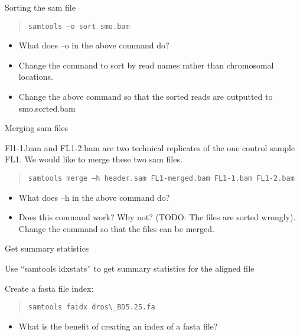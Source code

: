 \documentclass[letterpaper,10pt,english]{sphinxmanual}
\begin{document}
Sorting the sam file
\begin{quote}

\begin{Verbatim}[commandchars=\\\{\}]
samtools –o sort smo.bam
\end{Verbatim}
\end{quote}
\begin{itemize}
\item {} 
What does –o in the above command do?

\item {} 
Change the command to sort by read names rather than chromosomal locations.

\item {} 
Change the above command so that the sorted reads are outputted to smo.sorted.bam

\end{itemize}

Merging sam files

Fl1-1.bam and FL1-2.bam are two technical replicates of the one control sample FL1. We would like to merge these two sam files.
\begin{quote}

\begin{Verbatim}[commandchars=\\\{\}]
samtools merge –h header.sam FL1-merged.bam FL1-1.bam FL1-2.bam
\end{Verbatim}
\end{quote}
\begin{itemize}
\item {} 
What does –h in the above command do?

\item {} 
Does this command work? Why not? (TODO: The files are sorted wrongly). Change the command so that the files can be merged.

\end{itemize}

Get summary statistics

Use “samtools idxstats” to get summary statistics for the aligned file

Create a fasta file index:
\begin{quote}

\begin{Verbatim}[commandchars=\\\{\}]
samtools faidx dros\_BD5.25.fa
\end{Verbatim}
\end{quote}
\begin{itemize}
\item {} 
What is the benefit of creating an index of a fasta file?

\end{itemize}
\end{document}
